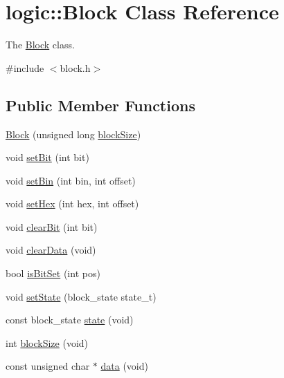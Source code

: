 \hypertarget{classlogic_1_1_block}{}\section{logic\+:\+:Block Class Reference}
\label{classlogic_1_1_block}


The \mbox{\hyperlink{classlogic_1_1_block}{Block}} class.  




{\ttfamily \#include $<$block.\+h$>$}

\subsection*{Public Member Functions}
\begin{DoxyCompactItemize}
\item 
\mbox{\hyperlink{classlogic_1_1_block_a893088c60b4c0c41370eb5df87b566d0}{Block}} (unsigned long \mbox{\hyperlink{classlogic_1_1_block_a0b57337ab5b3817a6509efd1a323c3eb}{block\+Size}})
\item 
void \mbox{\hyperlink{classlogic_1_1_block_acb19637acf2ec89d7d9fde9b40b3cd29}{set\+Bit}} (int bit)
\item 
void \mbox{\hyperlink{classlogic_1_1_block_a9f25c077733b21120df01e5174a8dfc7}{set\+Bin}} (int bin, int offset)
\item 
void \mbox{\hyperlink{classlogic_1_1_block_ab7c61557660651b8afb417ac6fff8418}{set\+Hex}} (int hex, int offset)
\item 
void \mbox{\hyperlink{classlogic_1_1_block_aaf20f779418e0491c626e009f1e66bb9}{clear\+Bit}} (int bit)
\item 
void \mbox{\hyperlink{classlogic_1_1_block_aa63e9635221bda7c6660a5c254510e78}{clear\+Data}} (void)
\item 
bool \mbox{\hyperlink{classlogic_1_1_block_a0130b21b567a1149edcc02c48ccc52ef}{is\+Bit\+Set}} (int pos)
\item 
void \mbox{\hyperlink{classlogic_1_1_block_a2568d052f60f1c8fb59cc099bb8ba12b}{set\+State}} (block\+\_\+state state\+\_\+t)
\item 
const block\+\_\+state \mbox{\hyperlink{classlogic_1_1_block_a0a84f5b5c790173d5f3ed4db2f33535b}{state}} (void)
\item 
int \mbox{\hyperlink{classlogic_1_1_block_a0b57337ab5b3817a6509efd1a323c3eb}{block\+Size}} (void)
\item 
const unsigned char $\ast$ \mbox{\hyperlink{classlogic_1_1_block_a2c8b08fd7d36f82b34b7d89268f2da4f}{data}} (void)
\end{DoxyCompactItemize}

